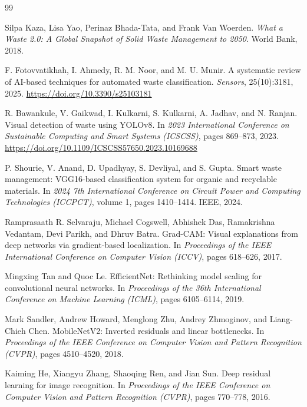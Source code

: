 \documentclass[11pt,a4paper]{article}
\begin{document}
	\clearpage
\begin{thebibliography}{99}
		
		Silpa Kaza, Lisa Yao, Perinaz Bhada-Tata, and Frank Van Woerden.
		\textit{What a Waste 2.0: A Global Snapshot of Solid Waste Management to 2050}.
		World Bank, 2018.
		
		F. Fotovvatikhah, I. Ahmedy, R. M. Noor, and M. U. Munir.
		A systematic review of AI-based techniques for automated waste classification.
		\textit{Sensors}, 25(10):3181, 2025.
		\url{https://doi.org/10.3390/s25103181}
		
		R. Bawankule, V. Gaikwad, I. Kulkarni, S. Kulkarni, A. Jadhav, and N. Ranjan.
		Visual detection of waste using YOLOv8.
		In \textit{2023 International Conference on Sustainable Computing and Smart Systems (ICSCSS)}, pages 869--873, 2023.
		\url{https://doi.org/10.1109/ICSCSS57650.2023.10169688}
		
		P. Shourie, V. Anand, D. Upadhyay, S. Devliyal, and S. Gupta.
		Smart waste management: VGG16-based classification system for organic and recyclable materials.
		In \textit{2024 7th International Conference on Circuit Power and Computing Technologies (ICCPCT)}, volume 1, pages 1410--1414. IEEE, 2024.
		
		Ramprasaath R. Selvaraju, Michael Cogswell, Abhishek Das, Ramakrishna Vedantam, Devi Parikh, and Dhruv Batra.
		Grad-CAM: Visual explanations from deep networks via gradient-based localization.
		In \textit{Proceedings of the IEEE International Conference on Computer Vision (ICCV)}, pages 618--626, 2017.
		
		Mingxing Tan and Quoc Le.
		EfficientNet: Rethinking model scaling for convolutional neural networks.
		In \textit{Proceedings of the 36th International Conference on Machine Learning (ICML)}, pages 6105--6114, 2019.
		
		Mark Sandler, Andrew Howard, Menglong Zhu, Andrey Zhmoginov, and Liang-Chieh Chen.
		MobileNetV2: Inverted residuals and linear bottlenecks.
		In \textit{Proceedings of the IEEE Conference on Computer Vision and Pattern Recognition (CVPR)}, pages 4510--4520, 2018.
		
		Kaiming He, Xiangyu Zhang, Shaoqing Ren, and Jian Sun.
		Deep residual learning for image recognition.
		In \textit{Proceedings of the IEEE Conference on Computer Vision and Pattern Recognition (CVPR)}, pages 770--778, 2016.
		

\end{thebibliography}
\end{document}
